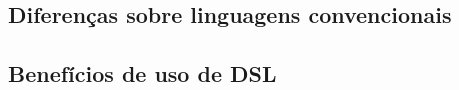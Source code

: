 \subsection{Diferenças sobre linguagens convencionais}
\label{diferencasdsl}


\subsection{Benefícios de uso de DSL}
\label{beneficiosdsl}